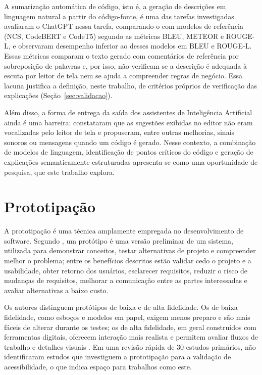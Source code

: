 \documentclass[
    12pt,                   %
    openright,              %
    oneside,                %
    a4paper,                %
    sumario=tradicional,    %
    english,                %
    brazil,                 %
    ]{abntex2}
\begin{document}
A sumarização automática de código, isto é, a geração de descrições em linguagem natural a partir do código-fonte, é uma das tarefas investigadas. \textcite{sun2023chatgptsum} avaliaram o ChatGPT nessa tarefa, comparando-o com modelos de referência (NCS, CodeBERT e CodeT5) segundo as métricas BLEU, METEOR e ROUGE-L, e observaram desempenho inferior ao desses modelos em BLEU e ROUGE-L. Essas métricas comparam o texto gerado com comentários de referência por sobreposição de palavras e, por isso, não verificam se a descrição é adequada à escuta por leitor de tela nem se ajuda a compreender regras de negócio. Essa lacuna justifica a definição, neste trabalho, de critérios próprios de verificação das explicações (Seção~\ref{sec:validacao}).

Além disso, a forma de entrega da saída dos assistentes de Inteligência Artificial ainda é uma barreira: \textcite{latinoware34224} constataram que as sugestões exibidas no editor não eram vocalizadas pelo leitor de tela e propuseram, entre outras melhorias, sinais sonoros ou mensagens quando um código é gerado. Nesse contexto, a combinação de modelos de linguagem, identificação de pontos críticos do código e geração de explicações semanticamente estruturadas apresenta-se como uma oportunidade de pesquisa, que este trabalho explora.

\section{Prototipação}\label{sec:Prototipacao}

A prototipação é uma técnica amplamente empregada no desenvolvimento de software. Segundo \textcite{latinoware7985}, um protótipo é uma versão preliminar de um sistema, utilizada para demonstrar conceitos, testar alternativas de projeto e compreender melhor o problema; entre os benefícios descritos estão validar cedo o projeto e a usabilidade, obter retorno dos usuários, esclarecer requisitos, reduzir o risco de mudanças de requisitos, melhorar a comunicação entre as partes interessadas e avaliar alternativas a baixo custo.

Os autores distinguem protótipos de baixa e de alta fidelidade. Os de baixa fidelidade, como esboços e modelos em papel, exigem menos preparo e são mais fáceis de alterar durante os testes; os de alta fidelidade, em geral construídos com ferramentas digitais, oferecem interação mais realista e permitem avaliar fluxos de trabalho e detalhes visuais \cite{latinoware7985}. Em uma revisão rápida de 30 estudos primários, \textcite{latinoware7985} não identificaram estudos que investiguem a prototipação para a validação de acessibilidade, o que indica espaço para trabalhos como este.
\end{document}
